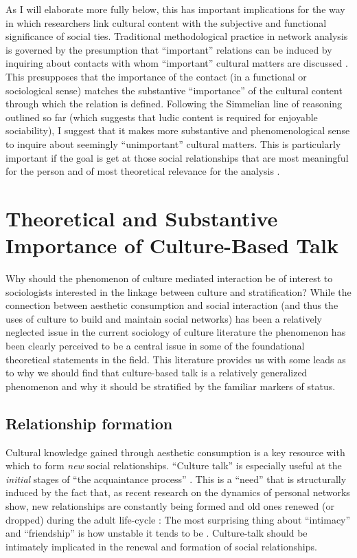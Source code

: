 \documentclass[11pt]{article}
\begin{document}
As I will elaborate more fully  below, this has important implications for the way in which researchers link cultural content with the subjective and functional significance of social ties.  Traditional methodological practice in network analysis is governed by the presumption that ``important'' relations can be induced by inquiring about contacts with whom ``important'' cultural matters are discussed \citep{burt84, marsden87}.   This presupposes that the importance of the contact (in a functional or sociological sense) matches the substantive ``importance'' of the cultural content through which the relation is defined. Following the Simmelian line of reasoning outlined so far (which suggests that ludic content is required for enjoyable sociability), I suggest that it makes more substantive and phenomenological sense to inquire about seemingly ``unimportant'' cultural matters.  This is particularly important if the goal is get at those social relationships that are most meaningful for the person and of most theoretical relevance for the analysis \citep{pachuki_breiger10, mische10}.

\section{Theoretical and Substantive Importance of Culture-Based Talk}  
Why should the phenomenon of culture mediated interaction be of interest to sociologists interested in the linkage between culture and stratification?  While the connection between aesthetic consumption and social interaction (and thus the uses of culture to build and maintain social networks) has been a relatively neglected issue in the current sociology of culture literature the phenomenon has been clearly perceived to be a central issue in some of the foundational theoretical statements in the field. This literature provides us with some leads as to why we should find that culture-based talk is a relatively generalized phenomenon and why it should be stratified by the familiar markers of status.  

\subsection{Relationship formation}
Cultural knowledge gained through aesthetic consumption is a key resource with which to form \emph{new} social relationships.  ``Culture talk'' is especially useful at the \emph{initial} stages of ``the acquaintance process'' \citep{newcomb61}.  This is a ``need'' that is structurally induced by the fact that, as recent research on the dynamics of personal networks show, new relationships are constantly being formed and old ones renewed (or dropped) during the adult life-cycle \citep{bidart_degenne05, burt00}:  The most surprising thing about ``intimacy'' and ``friendship'' is how unstable it tends to be \citep{wellman_etal97}. Culture-talk should be intimately implicated in the renewal and formation of social relationships.
\end{document}
